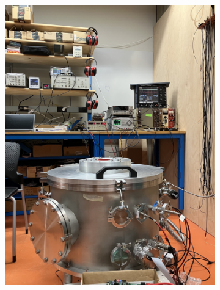 \begin{figure}[]
\centering
\begin{subfigure}{.5\textwidth}
  \centering
  \includegraphics[width=\textwidth]{images/saq_wellesley_tpc.jpg}
  \caption{}
\end{subfigure}%
\begin{subfigure}{.5\textwidth}
  \centering

\end{subfigure}
\end{figure}
